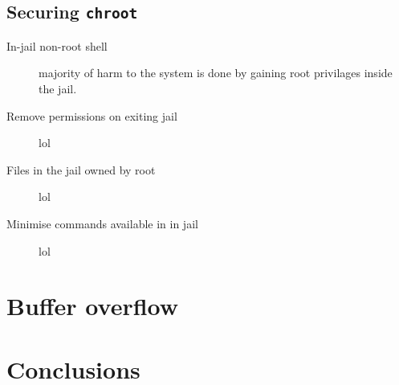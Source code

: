 \documentclass[12pt, a4paper, pdflatex]{article}
\begin{document}
\subsection{Securing \texttt{chroot}}
\begin{description}
  \item[In-jail non-root shell] majority of harm to the system is done by gaining root privilages inside the jail.
  \item[Remove permissions on exiting jail] lol
  \item[Files in the jail owned by root] lol
  \item[Minimise commands available in in jail] lol
\end{description}

\section{Buffer overflow}
\lipsum[3]

\section{Conclusions}
\end{document}
